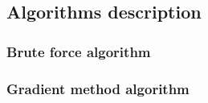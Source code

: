 \subsection{Algorithms description}
\label{subsec:algo_description}

\subsubsection{Brute force algorithm}
\label{subsubsec:brute_force_algo}

\subsubsection{Gradient method algorithm}
\label{subsubsec:gradient_algo}